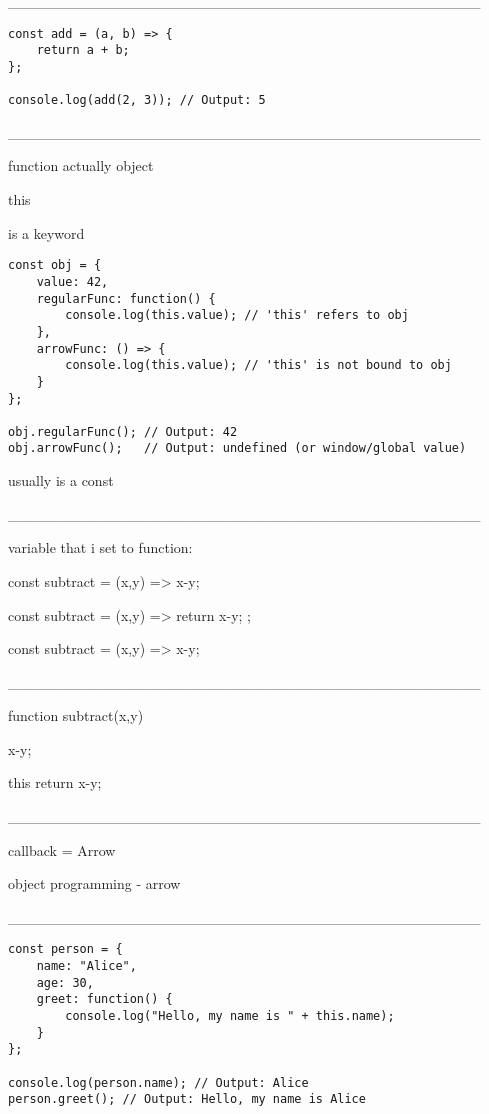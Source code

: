 _____________________________________________



\begin{verbatim}
const add = (a, b) => {
    return a + b;
};

console.log(add(2, 3)); // Output: 5
\end{verbatim}

_____________________________________________

function actually object

this 

is a keyword


\begin{verbatim}
const obj = {
    value: 42,
    regularFunc: function() {
        console.log(this.value); // 'this' refers to obj
    },
    arrowFunc: () => {
        console.log(this.value); // 'this' is not bound to obj
    }
};

obj.regularFunc(); // Output: 42
obj.arrowFunc();   // Output: undefined (or window/global value)
\end{verbatim}


usually is a const

_____________________________________________

variable that i set to function:


const subtract = (x,y) => x-y;

const subtract = (x,y) =>{
   return x-y;
};





const subtract = (x,y) => x-y;

_____________________________________________


function subtract(x,y) { x-y;

    this 
    return x-y;
}

_____________________________________________

callback = Arrow


object programming - arrow

_____________________________________________



\begin{verbatim}
const person = {
    name: "Alice",
    age: 30,
    greet: function() {
        console.log("Hello, my name is " + this.name);
    }
};

console.log(person.name); // Output: Alice
person.greet(); // Output: Hello, my name is Alice
\end{verbatim}

